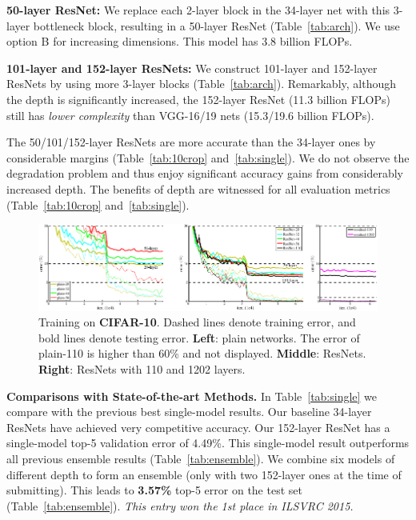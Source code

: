 \documentclass[10pt,twocolumn,letterpaper]{article}
\begin{document}
\textbf{50-layer ResNet:} We replace each 2-layer block in the 34-layer net with this 3-layer bottleneck block, resulting in a 50-layer ResNet (Table~\ref{tab:arch}). We use option B for increasing dimensions.
This model has 3.8 billion FLOPs.

\textbf{101-layer and 152-layer ResNets:} We construct 101-layer and 152-layer ResNets by using more 3-layer blocks (Table~\ref{tab:arch}).
Remarkably, although the depth is significantly increased, the 152-layer ResNet (11.3 billion FLOPs) still has \emph{lower complexity} than VGG-16/19 nets (15.3/19.6 billion FLOPs).

The 50/101/152-layer ResNets are more accurate than the 34-layer ones by considerable margins (Table~\ref{tab:10crop} and~\ref{tab:single}). We do not observe the degradation problem and thus enjoy significant accuracy gains from considerably increased depth. The benefits of depth are witnessed for all evaluation metrics (Table~\ref{tab:10crop} and~\ref{tab:single}).

\begin{figure}[t]
  \begin{center}
    \includegraphics[width=0.8\linewidth]{eps/cifar}
  \end{center}
  \vspace{-1.5em}
  \caption{Training on \textbf{CIFAR-10}. Dashed lines denote training error, and bold lines denote testing error. \textbf{Left}: plain networks. The error of plain-110 is higher than 60\% and not displayed. \textbf{Middle}: ResNets. \textbf{Right}: ResNets with 110 and 1202 layers.}
  \label{fig:cifar}
\end{figure}

\vspace{6pt}
\noindent\textbf{Comparisons with State-of-the-art Methods.}
In Table~\ref{tab:single} we compare with the previous best single-model results.
Our baseline 34-layer ResNets have achieved very competitive accuracy.
Our 152-layer ResNet has a single-model top-5 validation error of 4.49\%. This single-model result outperforms all previous ensemble results (Table~\ref{tab:ensemble}).
We combine six models of different depth to form an ensemble (only with two 152-layer ones at the time of submitting). This leads to \textbf{3.57\%} top-5 error on the test set (Table~\ref{tab:ensemble}). \emph{This entry won the 1st place in ILSVRC 2015.}
\end{document}
